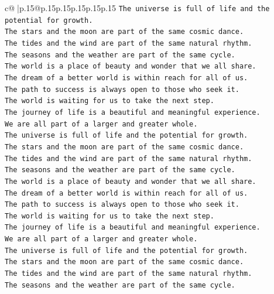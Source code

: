 \documentclass{article}
\begin{document}
{\begin{supertabular}{c@{$\;$}|p{.15\linewidth}@{}p{.15\linewidth}p{.15\linewidth}p{.15\linewidth}p{.15\linewidth}p{.15\linewidth}}
{{{\texttt{The universe is full of life and the potential for growth.} \\
\texttt{The stars and the moon are part of the same cosmic dance.} \\
\texttt{The tides and the wind are part of the same natural rhythm.} \\
\texttt{The seasons and the weather are part of the same cycle.} \\
\texttt{The world is a place of beauty and wonder that we all share.} \\
\texttt{The dream of a better world is within reach for all of us.} \\
\texttt{The path to success is always open to those who seek it.} \\
\texttt{The world is waiting for us to take the next step.} \\
\texttt{The journey of life is a beautiful and meaningful experience.} \\
\texttt{We are all part of a larger and greater whole.} \\
\texttt{The universe is full of life and the potential for growth.} \\
\texttt{The stars and the moon are part of the same cosmic dance.} \\
\texttt{The tides and the wind are part of the same natural rhythm.} \\
\texttt{The seasons and the weather are part of the same cycle.} \\
\texttt{The world is a place of beauty and wonder that we all share.} \\
\texttt{The dream of a better world is within reach for all of us.} \\
\texttt{The path to success is always open to those who seek it.} \\
\texttt{The world is waiting for us to take the next step.} \\
\texttt{The journey of life is a beautiful and meaningful experience.} \\
\texttt{We are all part of a larger and greater whole.} \\
\texttt{The universe is full of life and the potential for growth.} \\
\texttt{The stars and the moon are part of the same cosmic dance.} \\
\texttt{The tides and the wind are part of the same natural rhythm.} \\
\texttt{The seasons and the weather are part of the same cycle.} \\
}}}
\end{supertabular}}
\end{document}

